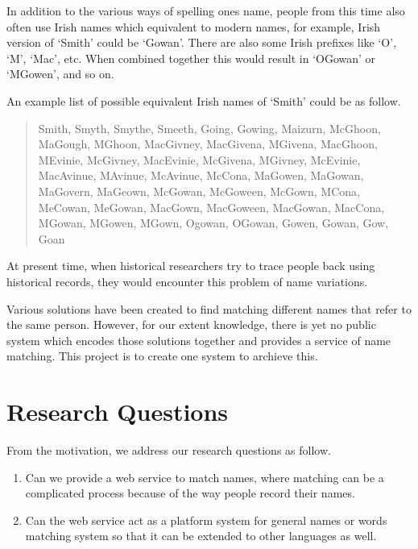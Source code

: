 In addition to the various ways of spelling one\textquotesingle s name,
people from this time also often use Irish names which equivalent to modern names,
for example, Irish version of `Smith' could be `Gowan'.
There are also some Irish prefixes like `O\textquotesingle', `M\textquotesingle', `Mac',
etc. When combined together this would result in `O\textquotesingle Gowan' or
`M\textquotesingle Gowen', and so on.

An example list of possible equivalent Irish names of `Smith'
could be as follow.

\begin{quotation} \noindent
Smith, Smyth, Smythe, Smeeth, Going, Gowing, Maizurn, McGhoon, MaGough,
M\textquotesingle Ghoon, MacGivney, MacGivena, M\textquotesingle Givena,
MacGhoon, M\textquotesingle Evinie, McGivney, MacEvinie, McGivena,
M\textquotesingle Givney, McEvinie, MacAvinue, M\textquotesingle Avinue,
McAvinue, McCona, MaGowen, MaGowan, MaGovern, MaGeown, McGowan, McGoween,
McGown, M\textquotesingle Cona, MeCowan, MeGowan, MacGown, MacGoween,
MacGowan, MacCona, M\textquotesingle Gowan, M\textquotesingle Gowen,
M\textquotesingle Gown, Ogowan, O\textquotesingle Gowan, Gowen,
Gowan, Gow, Goan
\end{quotation}

At present time, when historical researchers try to trace people back
using historical records, they would encounter this problem of
name variations.

Various solutions have been created to find
matching different names that refer to the same person. However,
for our extent knowledge, there is yet no public system which encodes
those solutions together and provides a service of name matching.
This project is to create one system to archieve this.

\section{Research Questions}
\label{sec:rq}

From the motivation, we address our research questions as follow.

\begin{enumerate}
  \item Can we provide a web service to match names, where matching can be
    a complicated process because of the way people record their names.
  \item Can the web service act as a platform system for general names or words
    matching system so that it can be extended to other languages as well.
\end{enumerate}

